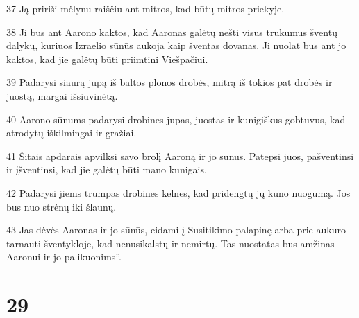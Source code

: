 \par 37 Ją pririši mėlynu raiščiu ant mitros, kad būtų mitros priekyje. 
\par 38 Ji bus ant Aarono kaktos, kad Aaronas galėtų nešti visus trūkumus šventų dalykų, kuriuos Izraelio sūnūs aukoja kaip šventas dovanas. Ji nuolat bus ant jo kaktos, kad jie galėtų būti priimtini Viešpačiui. 
\par 39 Padarysi siaurą jupą iš baltos plonos drobės, mitrą iš tokios pat drobės ir juostą, margai išsiuvinėtą. 
\par 40 Aarono sūnums padarysi drobines jupas, juostas ir kunigiškus gobtuvus, kad atrodytų iškilmingai ir gražiai. 
\par 41 Šitais apdarais apvilksi savo brolį Aaroną ir jo sūnus. Patepsi juos, pašventinsi ir įšventinsi, kad jie galėtų būti mano kunigais. 
\par 42 Padarysi jiems trumpas drobines kelnes, kad pridengtų jų kūno nuogumą. Jos bus nuo strėnų iki šlaunų. 
\par 43 Jas dėvės Aaronas ir jo sūnūs, eidami į Susitikimo palapinę arba prie aukuro tarnauti šventykloje, kad nenusikalstų ir nemirtų. Tas nuostatas bus amžinas Aaronui ir jo palikuonims”.



\chapter{29}



